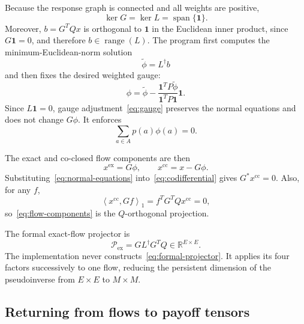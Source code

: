 \documentclass[11pt]{article}
\newcommand{\R}{\mathbb{R}}
\newcommand{\one}{\mathbf{1}}
\newcommand{\range}{\operatorname{range}}
\newcommand{\ip}[2]{\left\langle #1,#2\right\rangle}
\begin{document}
Because the response graph is connected and all weights are positive,
\[
 \ker G=\ker L=\operatorname{span}\{\one\}.
\]
Moreover, $b=G^TQx$ is orthogonal to $\one$ in the Euclidean inner product,
since $G\one=0$, and therefore $b\in\range(L)$.  The program first computes
the minimum-Euclidean-norm solution
\[
 \widetilde\phi=L^\dagger b
\]
and then fixes the desired weighted gauge:
\begin{equation}
 \phi=\widetilde\phi-
 \frac{\one^TP\widetilde\phi}{\one^TP\one}\one.
 \label{eq:gauge}
\end{equation}
Since $L\one=0$, gauge adjustment~\eqref{eq:gauge} preserves the normal
equations and does not change $G\phi$.  It enforces
\[
 \sum_{a\in A}p(a)\phi(a)=0.
\]

The exact and co-closed flow components are then
\begin{equation}
 x^{\mathrm{ex}}=G\phi,
 \qquad x^{\mathrm{cc}}=x-G\phi.
 \label{eq:flow-components}
\end{equation}
Substituting~\eqref{eq:normal-equations} into~\eqref{eq:codifferential} gives
$G^*x^{\mathrm{cc}}=0$.  Also, for any $f$,
\[
 \ip{x^{\mathrm{cc}}}{Gf}_1
 =f^TG^TQx^{\mathrm{cc}}=0,
\]
so~\eqref{eq:flow-components} is the $Q$-orthogonal projection.

The formal exact-flow projector is
\begin{equation}
 \mathcal P_{\mathrm{ex}}=GL^\dagger G^TQ\in\R^{E\times E}.
 \label{eq:formal-projector}
\end{equation}
The implementation never constructs~\eqref{eq:formal-projector}.  It applies
its four factors successively to one flow, reducing the persistent dimension
of the pseudoinverse from $E\times E$ to $M\times M$.

\subsection{Returning from flows to payoff tensors}
\end{document}
